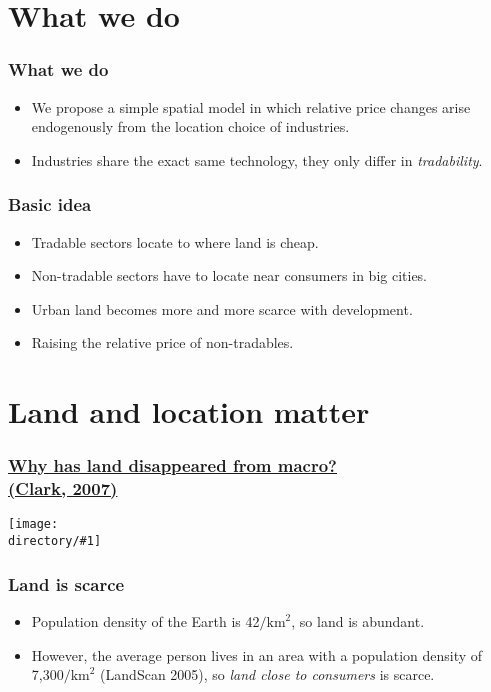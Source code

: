 \documentclass[compress,mathserif]{beamer}
\newcounter{perc}
\newcounter{percek}
\newcommand{\directory}{figures}
\newcommand{\widefigure}[2]{\begin{frame}\frametitle{\hyperlink{#1back}{#2}}\hypertarget{#1}{{\begin{center}\texttt{[image: \\directory/\#1]}\end{center}}}\end{frame}}
\renewcommand{\time}[1]{\addtocounter{percek}{#1}}
\begin{document}
\section{What we do}
\begin{frame}\frametitle{What we do}

\begin{itemize}
    \item We propose a simple spatial model in which relative price changes arise endogenously from the location choice of industries.
    \item Industries share the exact same technology, they only differ in \emph{tradability}.
\end{itemize}

\end{frame}

\begin{frame}\frametitle{Basic idea}
\begin{itemize}
    \item Tradable sectors locate to where land is cheap.
    \item Non-tradable sectors have to locate near consumers in big cities.
    \item Urban land becomes more and more scarce with development.
    \item Raising the relative price of non-tradables.
\end{itemize}
\end{frame}
\time{2}



\section{Land and location matter}
\widefigure{clark-landrents}{Why has land disappeared from macro?\\ (Clark, 2007)}

\begin{frame}\frametitle{Land is scarce}
\begin{itemize}
    \item Population density of the Earth is 42$/\text{km}^2$, so land is abundant.
    \pause
    \item However, the average person lives in an area with a population density of 7,300$/\text{km}^2$ (LandScan 2005),
    so \emph{land close to consumers} is scarce.
\end{itemize}
\end{frame}
\time 2
\end{document}
